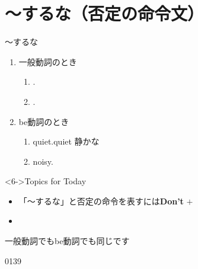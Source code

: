 \documentclass[aspectratio=169,xcolor={dvipsnames,table}]{beamer}
\begin{document}
\section{～するな（否定の命令文）}
\begin{frame}[plain]{～するな}
\begin{enumerate}
 \item<1-> 一般動詞のとき
\begin{enumerate}
	\item<2-> .
	\item<3->  .
       \end{enumerate} 
 \item<1-> be動詞のとき
\begin{enumerate}
	\item<4->  quiet.\hfill{\scriptsize quiet  静かな}
	\item<5->   noisy.\hfill{}
       \end{enumerate}
\end{enumerate}

\begin{block}<6->{Topics for Today}
\begin{itemize}[square]\small
 \item 「～するな」と否定の命令を表すには\textbf{Don't} $+$ 
 \item {}
 \end{itemize}
\hfill{\scriptsize 一般動詞でもbe動詞でも同じです}
    \end{block}

\hfill{\tiny 0139}\,{\scriptsize {}}
\end{frame}
\end{document}
